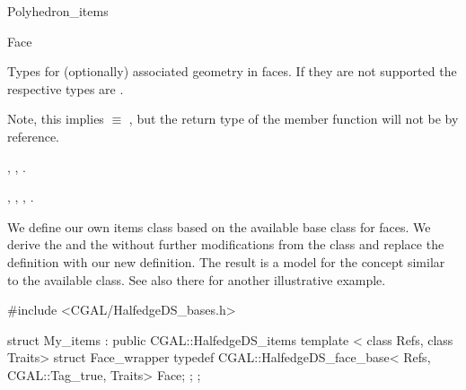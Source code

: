 \begin{ccRefConcept}{Polyhedron_items}
\begin{ccClass}{Face}

Types for (optionally) associated geometry in faces. If they
are not supported the respective types are .

\ccGlue
{}

\ccGlue
{}

\ccTagFullDeclarations
{}
         
Note, this implies  $\equiv$ , but
the return type of the  member function will not be by reference.

\ccGlue
{}
\ccGlue
{}


\ccGlue
{}

\ccTagDefaults

\end{ccClass}

\ccHasModels

,
,
.

\ccSeeAlso

,
,
,
.

\ccExample

We define our own items class based on the available
 base class for faces. We derive the
 and the  without further
modifications from the  class and replace
the  definition with our new definition. The result
is a model for the  concept similar to the 
available  class. See also there for another
illustrative example. 

\begin{ccExampleCode}
#include <CGAL/HalfedgeDS_bases.h>

struct My_items : public CGAL::HalfedgeDS_items {
    template < class Refs, class Traits>
    struct Face_wrapper {
        typedef CGAL::HalfedgeDS_face_base< Refs, CGAL::Tag_true, Traits> Face;
    };
};
\end{ccExampleCode}

\end{ccRefConcept}

\ccRefPageEnd

